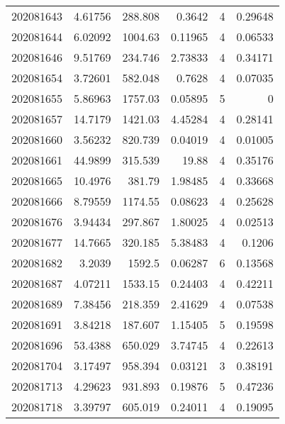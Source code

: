 \begin{tabular}{rrrrrr}
 202081643 &          4.61756 &      288.808  &            0.3642  &           4 & 0.29648 \\
 202081644 &          6.02092 &     1004.63   &            0.11965 &           4 & 0.06533 \\
 202081646 &          9.51769 &      234.746  &            2.73833 &           4 & 0.34171 \\
 202081654 &          3.72601 &      582.048  &            0.7628  &           4 & 0.07035 \\
 202081655 &          5.86963 &     1757.03   &            0.05895 &           5 & 0       \\
 202081657 &         14.7179  &     1421.03   &            4.45284 &           4 & 0.28141 \\
 202081660 &          3.56232 &      820.739  &            0.04019 &           4 & 0.01005 \\
 202081661 &         44.9899  &      315.539  &           19.88    &           4 & 0.35176 \\
 202081665 &         10.4976  &      381.79   &            1.98485 &           4 & 0.33668 \\
 202081666 &          8.79559 &     1174.55   &            0.08623 &           4 & 0.25628 \\
 202081676 &          3.94434 &      297.867  &            1.80025 &           4 & 0.02513 \\
 202081677 &         14.7665  &      320.185  &            5.38483 &           4 & 0.1206  \\
 202081682 &          3.2039  &     1592.5    &            0.06287 &           6 & 0.13568 \\
 202081687 &          4.07211 &     1533.15   &            0.24403 &           4 & 0.42211 \\
 202081689 &          7.38456 &      218.359  &            2.41629 &           4 & 0.07538 \\
 202081691 &          3.84218 &      187.607  &            1.15405 &           5 & 0.19598 \\
 202081696 &         53.4388  &      650.029  &            3.74745 &           4 & 0.22613 \\
 202081704 &          3.17497 &      958.394  &            0.03121 &           3 & 0.38191 \\
 202081713 &          4.29623 &      931.893  &            0.19876 &           5 & 0.47236 \\
 202081718 &          3.39797 &      605.019  &            0.24011 &           4 & 0.19095 \\

\end{tabular}
